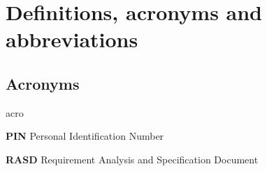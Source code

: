 \section{Definitions, acronyms and abbreviations}


\subsection{Acronyms}
	\begin{labeling}{acro}
		\item[\textbf{PIN}] Personal Identification Number
		\item[\textbf{RASD}] Requirement Analysis and Specification Document
	\end{labeling}

